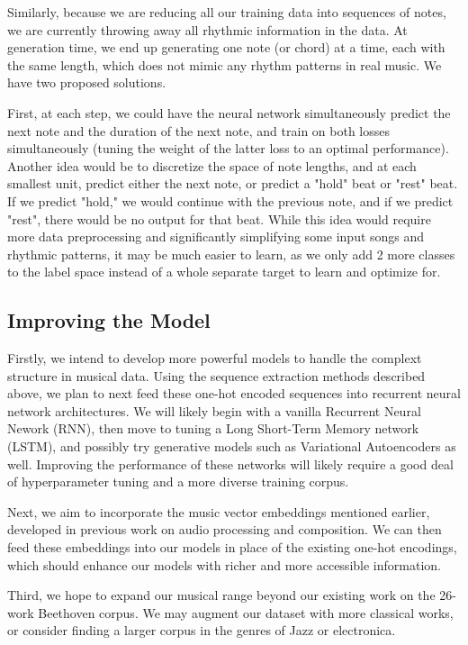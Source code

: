 \documentclass[twoside,twocolumn]{article}
\begin{document}
Similarly, because we are reducing all our training data into sequences of notes, we are currently throwing away all rhythmic information in the data. At generation time, we end up generating one note (or chord) at a time, each with the same length, which does not mimic any rhythm patterns in real music. We have two proposed solutions.

First, at each step, we could have the neural network simultaneously predict the next note and the duration of the next note, and train on both losses simultaneously (tuning the weight of the latter loss to an optimal performance). Another idea would be to discretize the space of note lengths, and at each smallest unit, predict either the next note, or predict a "hold" beat or "rest" beat. If we predict "hold," we would continue with the previous note, and if we predict "rest", there would be no output for that beat. While this idea would require more data preprocessing and significantly simplifying some input songs and rhythmic patterns, it may be much easier to learn, as we only add 2 more classes to the label space instead of a whole separate target to learn and optimize for.

\subsection{Improving the Model}

Firstly, we intend to develop more powerful models to handle the complext structure in musical data. Using the sequence extraction methods described above, we plan to next feed these one-hot encoded sequences into recurrent neural network architectures. We will likely begin with a vanilla Recurrent Neural Nework (RNN), then move to tuning a Long Short-Term Memory network (LSTM), and possibly try generative models such as Variational Autoencoders as well. Improving the performance of these networks will likely require a good deal of hyperparameter tuning and a more diverse training corpus.

Next, we aim to incorporate the music vector embeddings mentioned earlier, developed in previous work on audio processing and composition. We can then feed these embeddings into our models in place of the existing one-hot encodings, which should enhance our models with richer and more accessible information.

Third, we hope to expand our musical range beyond our existing work on the 26-work Beethoven corpus. We may augment our dataset with more classical works, or consider finding a larger corpus in the genres of Jazz or electronica.
\end{document}
